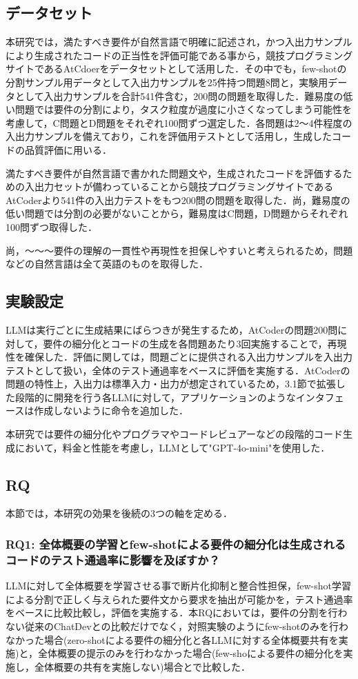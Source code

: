 \documentclass[submit,techrep,noauthor]{ipsj}
\begin{document}
\subsection{データセット}
本研究では，満たすべき要件が自然言語で明確に記述され，かつ入出力サンプルにより生成されたコードの正当性を評価可能である事から，競技プログラミングサイトであるAtCdoerをデータセットとして活用した．その中でも，few-shotの分割サンプル用データとして入出力サンプルを25件持つ問題8問と，実験用データとして入出力サンプルを合計541件含む，200問の問題を取得した．難易度の低い問題では要件の分割により，タスク粒度が過度に小さくなってしまう可能性を考慮して，C問題とD問題をそれぞれ100問ずつ選定した．各問題は2〜4件程度の入出力サンプルを備えており，これを評価用テストとして活用し，生成したコードの品質評価に用いる．

満たすべき要件が自然言語で書かれた問題文や，生成されたコードを評価するための入出力セットが備わっていることから競技プログラミングサイトであるAtCoder\cite{atcoder}より541件の入出力テストをもつ200問の問題を取得した．尚，難易度の低い問題では分割の必要がないことから，難易度はC問題，D問題からそれぞれ100問ずつ取得した．

尚，〜〜〜要件の理解の一貫性や再現性を担保しやすいと考えられるため，問題などの自然言語は全て英語のものを取得した．

\subsection{実験設定}
LLMは実行ごとに生成結果にばらつきが発生するため，AtCoderの問題200問に対して，要件の細分化とコードの生成を各問題あたり3回実施することで，再現性を確保した．評価に関しては，問題ごとに提供される入出力サンプルを入出力テストとして扱い，全体のテスト通過率をベースに評価を実施する．AtCoderの問題の特性上，入出力は標準入力・出力が想定されているため，3.1節で拡張した段階的に開発を行う各LLMに対して，アプリケーションのようなインタフェースは作成しないように命令を追加した．

本研究では要件の細分化やプログラマやコードレビュアーなどの段階的コード生成において，料金と性能を考慮し，LLMとして"GPT-4o-mini"\cite{gpt-4o-mini}を使用した．


\subsection{RQ}
本節では，本研究の効果を後続の3つの軸を定める．

\subsubsection{RQ1: 全体概要の学習とfew-shotによる要件の細分化は生成されるコードのテスト通過率に影響を及ぼすか？}
LLMに対して全体概要を学習させる事で断片化抑制と整合性担保，few-shot学習による分割で正しく与えられた要件文から要求を抽出が可能かを，テスト通過率をベースに比較比較し，評価を実施する．本RQにおいては，要件の分割を行わない従来のChatDevとの比較だけでなく，対照実験のようにfew-shotのみを行わなかった場合(zero-shotによる要件の細分化と各LLMに対する全体概要共有を実施)と，全体概要の提示のみを行わなかった場合(few-shoによる要件の細分化を実施し，全体概要の共有を実施しない)場合とで比較した．
\end{document}
